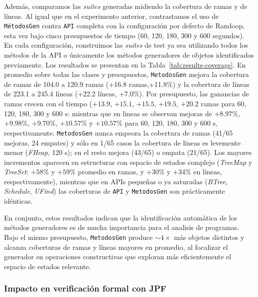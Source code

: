 Además, comparamos las \emph{suites} generadas midiendo la cobertura de ramas y de líneas. 
Al igual que en el experimento anterior, contrastamos el uso de \texttt{MétodosGen} contra 
\texttt{API} completa con la configuración por defecto de Randoop, 
esta vez bajo cinco presupuestos de tiempo (60, 120, 180, 300 y 600 segundos). 
En cada configuración, construimos las \emph{suites} de test ya sea utilizando 
todos los métodos de la API o únicamente los métodos generadores de objetos 
identificados previamente. Los resultados se presentan en la Tabla~\ref{tab:results-coverage}.
En promedio sobre todas las clases y presupuestos, \texttt{MetodosGen} mejora la
cobertura de ramas de 104.0 a 120.9 ramas
(+16.8 ramas,+11.8\%) y la cobertura de líneas de
223.1 a 245.4 líneas (+22.2 líneas, +7.0\%).
Por presupuesto, las ganancias de ramas crecen con el tiempo
(\(+13{.}9\), \(+15{.}1\), \(+15{.}5\), \(+19{.}5\), \(+20{.}2\) ramas para
60, 120, 180, 300 y 600 s: mientras que
en lineas se observan mejoras de \(+8{.}97\%\), \(+9{.}98\%\), \(+9{.}70\%\), \(+10{.}57\%\) y \(+10{.}57\%\) para 60, 120, 180, 300 y 600 s, respectivamente.
\texttt{MetodosGen} nunca empeora la cobertura de ramas (41/65 mejoras, 24 empates)
y sólo en 1/65 casos la cobertura de lineas es levemente menor
(\emph{FHeap}, 120 s); en el resto mejora (43/65) o empata (21/65).
Los mayores incrementos aparecen en estructuras con espacio de estados complejo
(\emph{TreeMap} y \emph{TreeSet}: \(+58\%\) y \(+59\%\) promedio en ramas,
y \(+30\%\) y \(+34\%\) en líneas, respectivamente), mientras que en APIs pequeñas o ya
saturadas (\emph{BTree}, \emph{Schedule}, \emph{UFind}) las coberturas de
\texttt{API} y \texttt{MetodosGen} son prácticamente idénticas.

En conjunto, estos resultados indican que la identificación automática de
los métodos generadores es de mucha importancia para el analisis de programas.
Bajo el mismo presupuesto, \texttt{MetodosGen} produce \(\sim 4\times\)
más objetos distintos y alcanza coberturas de ramas y líneas mayores en promedio,
al focalizar el generador en operaciones constructivas que exploran más
eficientemente el espacio de estados relevante.



\subsubsection{Impacto en verificación formal con JPF}

